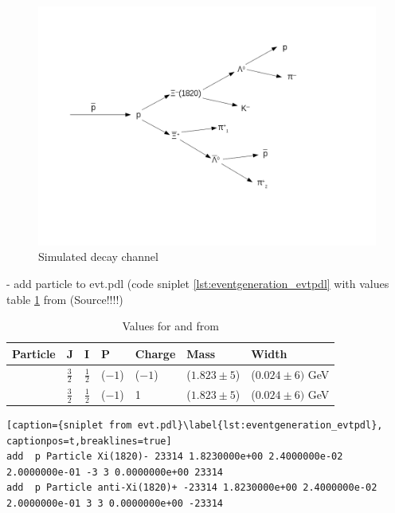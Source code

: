 \begin{figure}[htbp]
	\centering
			\includegraphics[width=1.00\textwidth]{./plots/DecayChannelXi1820.png}
	\caption{Simulated decay channel}
	\label{fig:eventgeneration_decaychannel}
\end{figure}

- add particle to evt.pdl (code sniplet \ref{lst:eventgeneration_evtpdl} with values table \ref{tab:eventgeneration_Xivalues} from \cite{PDG} (Source!!!!)

\begin{table}
	\centering
	\caption{Values for \excitedcascade and \excitedanticascade from \cite{PDG}}
	\label{tab:eventgeneration_Xivalues}
	\begin{tabular}{lllllll}
		\hline
		Particle & J & I & P & Charge & Mass  & Width \\
		\hline
		\hline
		\excitedcascade & $\frac{3}{2}$ & $\frac{1}{2}$ & ($-1$) & ($-1$) & ($1.823 \pm 5$)\massunit & ($0.024 \pm 6) $ GeV \\
		\excitedanticascade & $\frac{3}{2}$ & $\frac{1}{2}$ & ($-1$) & 1 & ($1.823 \pm 5$)\massunit & ($0.024 \pm 6) $ GeV\\
		\hline
		  
	\end{tabular}
\end{table}

\begin{lstlisting}[caption={sniplet from evt.pdl}\label{lst:eventgeneration_evtpdl}, captionpos=t,breaklines=true]
add  p Particle Xi(1820)- 23314 1.8230000e+00 2.4000000e-02 2.0000000e-01 -3 3 0.0000000e+00 23314
add  p Particle anti-Xi(1820)+ -23314 1.8230000e+00 2.4000000e-02 2.0000000e-01 3 3 0.0000000e+00 -23314

\end{lstlisting}